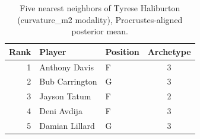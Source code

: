 \begin{table}[htbp]
  \centering\small
  \begin{tabular}{rllc}
    \toprule
    Rank & Player & Position & Archetype \\
    \midrule
    1 & Anthony Davis & F & 3 \\
    2 & Bub Carrington & G & 3 \\
    3 & Jayson Tatum & F & 2 \\
    4 & Deni Avdija & F & 3 \\
    5 & Damian Lillard & G & 3 \\
    \bottomrule
  \end{tabular}
  \caption{Five nearest neighbors of Tyrese Haliburton (curvature_m2 modality), Procrustes-aligned posterior mean.}
  \label{tab:Tyrese_Haliburton_neighbors_curvature_m2}
\end{table}

